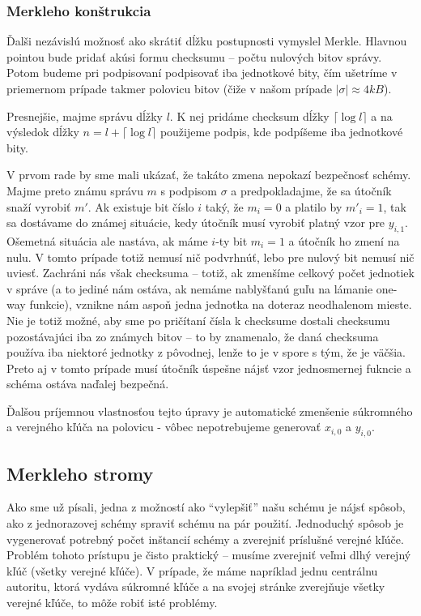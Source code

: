 \subsubsection{Merkleho konštrukcia}
Ďalši nezávislú možnosť ako skrátiť dĺžku postupnosti vymyslel
Merkle. Hlavnou pointou bude pridať akúsi formu checksumu -- počtu
nulových bitov správy. Potom budeme pri podpisovaní podpisovať iba
jednotkové bity, čím ušetríme v priemernom prípade takmer polovicu bitov
(čiže v našom prípade $|\sigma| \approx 4 \unit{kB}$).

Presnejšie, majme správu dĺžky $l$. K nej pridáme checksum dĺžky
$\lceil \log l \rceil$ a na výsledok dĺžky $n=l+\lceil \log l \rceil$
použijeme podpis, kde podpíšeme iba jednotkové bity.

V prvom rade by sme mali ukázať, že takáto zmena nepokazí bezpečnosť
schémy. Majme preto známu správu $m$ s podpisom $\sigma$ a
predpokladajme, že sa útočník snaží vyrobiť $m'$.
Ak existuje bit číslo $i$ taký, že $m_i=0$ a platilo by $m'_i=1$, tak sa dostávame
do známej situácie, kedy útočník musí vyrobiť platný vzor pre $y_{i,1}$.
Ošemetná situácia ale nastáva, ak máme $i$-ty bit $m_i=1$ a útočník ho zmení
na nulu. V tomto prípade totiž nemusí nič podvrhnúť, lebo pre nulový
bit nemusí nič uviesť. Zachráni nás však checksuma -- totiž, ak zmenšíme
celkový počet jednotiek v správe (a to jediné nám ostáva, ak nemáme
nablyšťanú guľu na lámanie one-way funkcie), vznikne nám aspoň jedna
jednotka na doteraz neodhalenom mieste. Nie je totiž možné, aby sme
po pričítaní čísla k checksume dostali checksumu pozostávajúci iba zo
známych bitov -- to by znamenalo, že daná checksuma používa iba
niektoré jednotky z pôvodnej, lenže to je v spore s tým, že je
väčšia. Preto aj v tomto prípade musí útočník úspešne nájsť vzor
jednosmernej fukncie a schéma ostáva naďalej bezpečná.

Ďalšou príjemnou vlastnosťou tejto úpravy je automatické zmenšenie
súkromného a verejného kľúča na polovicu - vôbec nepotrebujeme
generovať $x_{i,0}$ a $y_{i,0}$.

\subsection{Merkleho stromy}

Ako sme už písali, jedna z možností ako ``vylepšiť'' našu schému
je nájsť spôsob, ako z jednorazovej schémy spraviť schému na pár
použití. Jednoduchý spôsob je vygenerovať potrebný počet inštancií
schémy a zverejniť príslušné verejné kľúče. Problém tohoto prístupu je
čisto praktický -- musíme zverejniť veľmi dlhý verejný kľúč (všetky
verejné kľúče). V prípade, že máme napríklad jednu centrálnu autoritu,
ktorá vydáva súkromné kľúče a na svojej stránke zverejňuje všetky
verejné kľúče, to môže robiť isté problémy.


